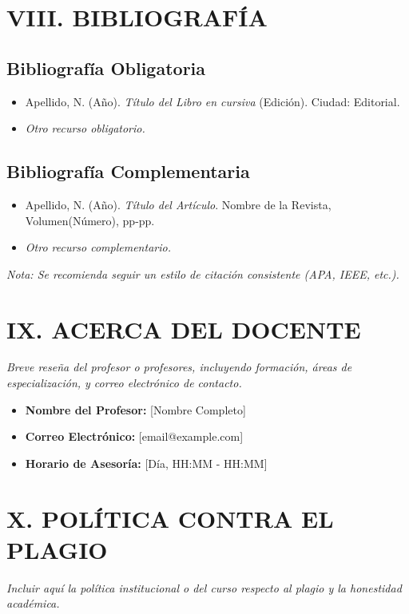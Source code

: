 \documentclass[12pt,a4paper]{article}
\begin{document}
\section*{VIII. BIBLIOGRAFÍA}
\subsection*{Bibliografía Obligatoria}
\begin{itemize}[leftmargin=*]
    \item Apellido, N. (Año). \textit{Título del Libro en cursiva} (Edición). Ciudad: Editorial.
    \item \textit{Otro recurso obligatorio.}
\end{itemize}

\subsection*{Bibliografía Complementaria}
\begin{itemize}[leftmargin=*]
    \item Apellido, N. (Año). \textit{Título del Artículo}. Nombre de la Revista, Volumen(Número), pp-pp.
    \item \textit{Otro recurso complementario.}
\end{itemize}
\textit{Nota: Se recomienda seguir un estilo de citación consistente (APA, IEEE, etc.).}
\vspace{0.5cm}

\section*{IX. ACERCA DEL DOCENTE}
\textit{Breve reseña del profesor o profesores, incluyendo formación, áreas de especialización, y correo electrónico de contacto.}
\begin{itemize}[leftmargin=*]
    \item \textbf{Nombre del Profesor:} [Nombre Completo]
    \item \textbf{Correo Electrónico:} [email@example.com]
    \item \textbf{Horario de Asesoría:} [Día, HH:MM - HH:MM]
\end{itemize}
\vspace{0.5cm}

\section*{X. POLÍTICA CONTRA EL PLAGIO}
\textit{Incluir aquí la política institucional o del curso respecto al plagio y la honestidad académica.}
\end{document}
